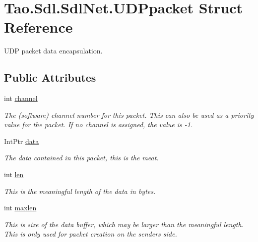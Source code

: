 \hypertarget{struct_tao_1_1_sdl_1_1_sdl_net_1_1_u_d_ppacket}{
\section{Tao.Sdl.SdlNet.UDPpacket Struct Reference}
\label{struct_tao_1_1_sdl_1_1_sdl_net_1_1_u_d_ppacket}
}


UDP packet data encapsulation.  


\subsection*{Public Attributes}
\begin{DoxyCompactItemize}
\item 
int \hyperlink{struct_tao_1_1_sdl_1_1_sdl_net_1_1_u_d_ppacket_ae1e8e37eafd7a1cf8519099cf3aa24f9}{channel}
\begin{DoxyCompactList}\small\item\em The (software) channel number for this packet. This can also be used as a priority value for the packet. If no channel is assigned, the value is -\/1. \item\end{DoxyCompactList}\item 
IntPtr \hyperlink{struct_tao_1_1_sdl_1_1_sdl_net_1_1_u_d_ppacket_a98fa7fe74e6b6e9eee3aa91c56151734}{data}
\begin{DoxyCompactList}\small\item\em The data contained in this packet, this is the meat. \item\end{DoxyCompactList}\item 
int \hyperlink{struct_tao_1_1_sdl_1_1_sdl_net_1_1_u_d_ppacket_a7d19809b30a730a41a02c0e31d49df23}{len}
\begin{DoxyCompactList}\small\item\em This is the meaningful length of the data in bytes. \item\end{DoxyCompactList}\item 
int \hyperlink{struct_tao_1_1_sdl_1_1_sdl_net_1_1_u_d_ppacket_a619c5482778530ded5a3415c57a692ec}{maxlen}
\begin{DoxyCompactList}\small\item\em This is size of the data buffer, which may be larger than the meaningful length. This is only used for packet creation on the senders side. \item\end{DoxyCompactList}\item 

\end{DoxyCompactItemize}
